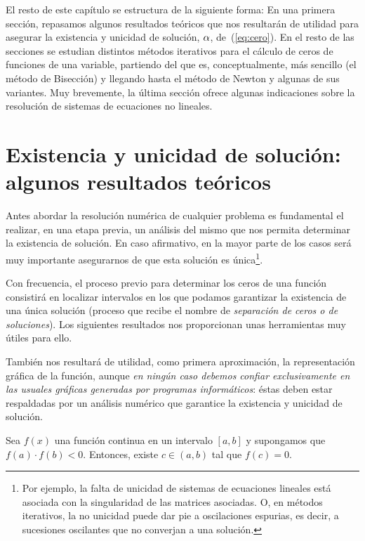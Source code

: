El resto de este capítulo se estructura de la siguiente forma: En una
primera sección, repasamos algunos resultados teóricos que nos
resultarán de utilidad para asegurar la existencia y unicidad de
solución, $\alpha$, de~(\ref{eq:cero}). En el resto de las secciones
se estudian distintos métodos iterativos para el cálculo de ceros de
funciones de una variable, partiendo del que es, conceptualmente, más
sencillo (el método de Bisección) y llegando hasta el método de Newton
y algunas de sus variantes. Muy brevemente, la última sección ofrece
algunas indicaciones sobre la resolución de sistemas de ecuaciones no
lineales.

\section{Existencia y unicidad de solución: algunos resultados teóricos}
\label{sec:tema1:exist-y-unic}

Antes abordar la resolución numérica de cualquier problema es
fundamental el realizar, en una etapa previa, un análisis del mismo
que nos permita determinar la existencia de solución. En caso
afirmativo, en la mayor parte de los casos será muy importante
asegurarnos de que esta solución es única\footnote{Por ejemplo,
  la falta de unicidad de sistemas de ecuaciones lineales está
  asociada con la singularidad de las matrices asociadas. O, en
  métodos iterativos, la no unicidad puede dar pie a
  oscilaciones espurias, es decir, a sucesiones oscilantes que no
  converjan a una solución.}.

Con frecuencia, el proceso previo para determinar los ceros de una
función consistirá en localizar intervalos en los que podamos
garantizar la existencia de una única solución (proceso que recibe el
nombre de \textit{separación de ceros o de soluciones}). Los
siguientes resultados nos proporcionan unas herramientas muy útiles
para ello.

También nos resultará de utilidad, como primera aproximación, la
representación gráfica de la función, aunque \textit{en ningún caso
  debemos confiar exclusivamente en las usuales gráficas generadas por
  programas informáticos}: éstas deben estar respaldadas por un
análisis numérico que garantice la existencia y unicidad de solución.

\begin{theorem}[Bolzano]
  \label{thm:rolle}
  Sea $f(x)$ una función continua en un intervalo $[a, b]$ y
  supongamos que $f (a)\cdot f (b) < 0$.  Entonces, existe
  $c\in(a, b)$ tal que $f (c) = 0$.
\end{theorem}

